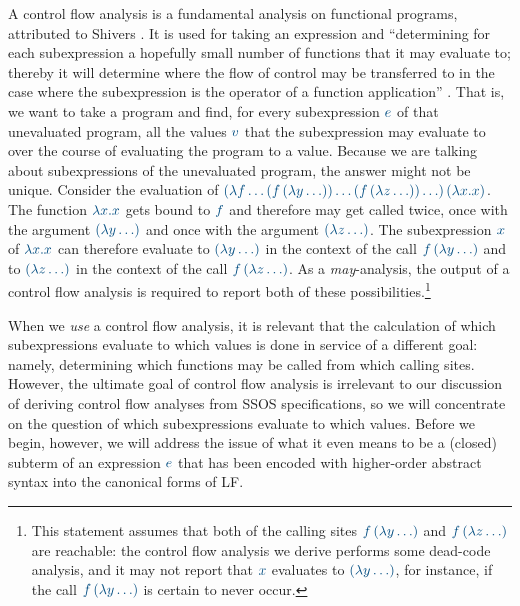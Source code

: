 A control flow analysis is a fundamental analysis on functional
programs, attributed to Shivers \cite{shivers88control}. It is used
for taking an expression and ``determining for each subexpression a
hopefully small number of functions that it may evaluate to; thereby
it will determine where the flow of control may be transferred to in
the case where the subexpression is the operator of a function
application'' \cite[p. 142]{nielson05principles}. That is, we want to
take a program and find, for every subexpression $\obj{e}$ of that
unevaluated program, all the values $\obj{v}$ that the subexpression
may evaluate to over the course of evaluating the program to a
value. Because we are talking about subexpressions of the unevaluated
program, the answer might not be unique. Consider the evaluation of
$\obj{(\lambda f\ldots (f\,(\lambda y\ldots)) \ldots (f\,(\lambda
  z\ldots)) \ldots )\,(\lambda x.x)}$. The function $\obj{\lambda
  x.x}$ gets bound to $\obj{f}$ and therefore may get called twice,
once with the argument $\obj{(\lambda y\ldots)}$ and once with the
argument $\obj{(\lambda z\ldots)}$. The subexpression $\obj{x}$ of
$\obj{\lambda x.x}$ can therefore evaluate to $\obj{(\lambda
  y\ldots)}$ in the context of the call $\obj{f\,(\lambda y\ldots)}$
and to $\obj{(\lambda z\ldots)}$ in the context of the call
$\obj{f\,(\lambda z\ldots)}$. As a {\it may}-analysis, the output of a
control flow analysis is required to report both of these
possibilities.\footnote{This statement assumes that both of the
  calling sites $\obj{f\,(\lambda y\ldots)}$ and $\obj{f\,(\lambda
    z\ldots)}$ are reachable: the control flow analysis we derive
  performs some dead-code analysis, and it may not report that
  $\obj{x}$ evaluates to $\obj{(\lambda y\ldots)}$, for instance, if
  the call $\obj{f\,(\lambda y\ldots)}$ is certain to never occur.}

When we {\it use} a control flow analysis, it is relevant that the
calculation of which subexpressions evaluate to which values is done
in service of a different goal: namely, determining which functions
may be called from which calling sites. However, the ultimate goal of
control flow analysis is irrelevant to our discussion of deriving
control flow analyses from SSOS specifications, so we will concentrate
on the question of which
subexpressions evaluate to which values. Before we
begin, however, we will address the issue of what it even means to be
a (closed) subterm of an expression $\obj{e}$ that has been encoded
with higher-order abstract syntax into the canonical forms of LF.

